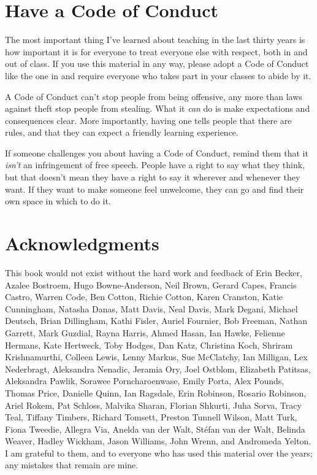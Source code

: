 \section{Have a Code of Conduct}\label{s:intro-code-of-conduct}

The most important thing I've learned about teaching in the last
thirty years is how important it is for everyone to treat everyone
else with respect, both in and out of class.  If you use this material
in any way, please adopt a Code of Conduct like the one in
 and require everyone who takes part in your classes
to abide by it.

A Code of Conduct can't stop people from being offensive, any more
than laws against theft stop people from stealing.  What it \emph{can}
do is make expectations and consequences clear.  More importantly,
having one tells people that there are rules, and that they can expect
a friendly learning experience.

If someone challenges you about having a Code of Conduct, remind them
that it \emph{isn't} an infringement of free speech.  People have a
right to say what they think, but that doesn't mean they have a right
to say it wherever and whenever they want.  If they want to make
someone feel unwelcome, they can go and find their own space in which
to do it.

\section{Acknowledgments}\label{s:intro-acknowledgments}

This book would not exist without the hard work and feedback of Erin
Becker, Azalee Bostroem, Hugo Bowne-Anderson, Neil Brown, Gerard
Capes, Francis Castro, Warren Code, Ben Cotton, Richie Cotton, Karen
Cranston, Katie Cunningham, Natasha Danas, Matt Davis, Neal Davis,
Mark Degani, Michael Deutsch, Brian Dillingham, Kathi Fisler, Auriel
Fournier, Bob Freeman, Nathan Garrett, Mark Guzdial, Rayna Harris,
Ahmed Hasan, Ian Hawke, Felienne Hermans, Kate Hertweck, Toby Hodges,
Dan Katz, Christina Koch, Shriram Krishnamurthi, Colleen Lewis, Lenny
Markus, Sue McClatchy, Ian Milligan, Lex Nederbragt, Aleksandra
Nenadic, Jeramia Ory, Joel Ostblom, Elizabeth Patitsas, Aleksandra
Pawlik, Sorawee Porncharoenwase, Emily Porta, Alex Pounds, Thomas
Price, Danielle Quinn, Ian Ragsdale, Erin Robinson, Rosario Robinson,
Ariel Rokem, Pat Schloss, Malvika Sharan, Florian Shkurti, Juha Sorva,
Tracy Teal, Tiffany Timbers, Richard Tomsett, Preston Tunnell Wilson,
Matt Turk, Fiona Tweedie, Allegra Via, Anelda van der Walt, St\'{e}fan
van der Walt, Belinda Weaver, Hadley Wickham, Jason Williams, John
Wrenn, and Andromeda Yelton.  I am grateful to them, and to everyone
who has used this material over the years; any mistakes that remain
are mine.

